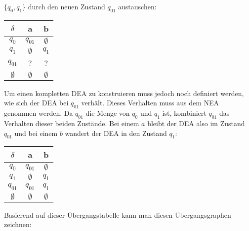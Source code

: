 \begin{flushleft}
    $\{q_0,q_1\}$ durch den neuen Zustand $q_{01}$ austauschen:
    \begin{center}
        \begin{tabular}{|c|c|c|}
            \hline
            $\delta$ & a & b \\
            \hline
            $q_0$ & $q_{01}$ & $\emptyset$ \\
            \hline
            $q_1$ & $\emptyset$ & $q_1$ \\
            \hline
            $q_{01}$ & ? & ? \\
            \hline
            $\emptyset$ & $\emptyset$ & $\emptyset$ \\
            \hline
        \end{tabular}
    \end{center}
    Um einen kompletten DEA zu konstruieren muss jedoch noch definiert werden, wie sich der DEA bei $q_{01}$ verhält.
    Dieses Verhalten muss aus dem NEA genommen werden. Da $q_{01}$ die Menge von $q_0$ und $q_1$ ist, kombiniert $q_{01}$
    das Verhalten dieser beiden Zustände. Bei einem $a$ bleibt der DEA also im Zustand $q_{01}$ und bei einem $b$ wandert 
    der DEA in den Zustand $q_1$:
    \begin{center}
        \begin{tabular}{|c|c|c|}
            \hline
            $\delta$ & a & b \\
            \hline
            $q_0$ & $q_{01}$ & $\emptyset$ \\
            \hline
            $q_1$ & $\emptyset$ & $q_1$ \\
            \hline
            $q_{01}$ & $q_{01}$ & $q_1$ \\
            \hline
            $\emptyset$ & $\emptyset$ & $\emptyset$ \\
            \hline
        \end{tabular}
    \end{center}
    Basierend auf dieser Übergangstabelle kann man diesen Übergangsgraphen zeichnen:
    \begin{center}
\end{center}
\end{flushleft}
